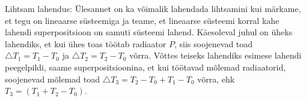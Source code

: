 {Lihtsam lahendus:
Ülesannet on ka võimalik lahendada lihtsamini kui märkame, et tegu on lineaarse süsteemiga ja teame, et lineaarse süsteemi korral kahe lahendi superpositsioon on samuti süsteemi lahend. Käesoleval juhul on üheks lahendiks, et kui ühes toas töötab radiaator $P$, siis soojenevad toad $\triangle T_1 = T_1 - T_0$ ja $\triangle T_2 = T_2 - T_0$ võrra. Võttes teiseks lahendiks esimese lahendi peegelpildi, saame superpositsioonina, et kui töötavad mõlemad radiaatorid, soojenevad mõlemad toad $\triangle T_3 = T_2 - T_0 + T_1 - T_0$ võrra, ehk $T_3 = (T_1 + T_2 - T_0)$. 
\fi
}